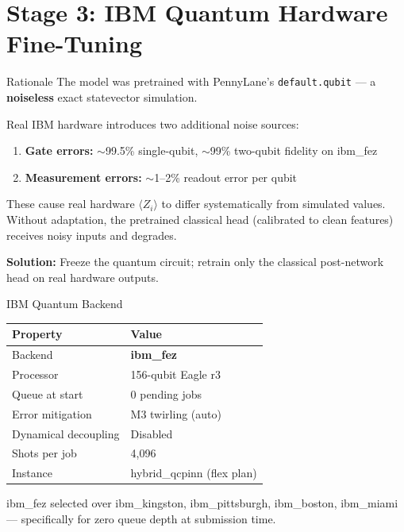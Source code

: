 \documentclass[aspectratio=169]{beamer}
\begin{document}
\section{Stage 3: IBM Quantum Hardware Fine-Tuning}

\begin{frame}{Rationale}
The model was pretrained with PennyLane's \texttt{default.qubit} --- a \textbf{noiseless} exact statevector simulation.

\vspace{0.3cm}
Real IBM hardware introduces two additional noise sources:
\begin{enumerate}
  \item \textbf{Gate errors:} $\sim$99.5\% single-qubit, $\sim$99\% two-qubit fidelity on ibm\_fez
  \item \textbf{Measurement errors:} $\sim$1--2\% readout error per qubit
\end{enumerate}

\vspace{0.3cm}
These cause real hardware $\langle Z_i \rangle$ to differ systematically from simulated values. Without adaptation, the pretrained classical head (calibrated to clean features) receives noisy inputs and degrades.

\vspace{0.3cm}
\textbf{Solution:} Freeze the quantum circuit; retrain only the classical post-network head on real hardware outputs.
\end{frame}

\begin{frame}{IBM Quantum Backend}
\begin{table}
\centering
\small
\begin{tabular}{ll}
\toprule
Property & Value \\
\midrule
Backend & \textbf{ibm\_fez} \\
Processor & 156-qubit Eagle r3 \\
Queue at start & 0 pending jobs \\
Error mitigation & M3 twirling (auto) \\
Dynamical decoupling & Disabled \\
Shots per job & 4,096 \\
Instance & hybrid\_qcpinn (flex plan) \\
\bottomrule
\end{tabular}
\end{table}

ibm\_fez selected over ibm\_kingston, ibm\_pittsburgh, ibm\_boston, ibm\_miami --- specifically for zero queue depth at submission time.
\end{frame}
\end{document}
